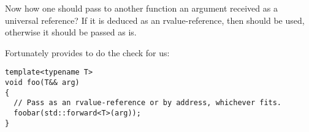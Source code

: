 Now how one should pass to another function an argument received as a
universal reference? If it is deduced as an rvalue-reference, then
 should be used, otherwise it should be passed as
is.

%
%
Fortunately  provides  to do the check for
us:

\begin{lstlisting}
template<typename T>
void foo(T&& arg)
{
  // Pass as an rvalue-reference or by address, whichever fits.
  foobar(std::forward<T>(arg));
}
\end{lstlisting}
